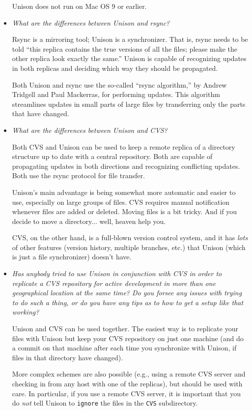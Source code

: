 \begin{itemize}
Unison does not run on Mac OS 9 or earlier.  

\item {\em What are the differences between Unison and rsync?}

Rsync is a mirroring tool; Unison is a synchronizer.  That is, rsync
needs to be told ``this replica contains the true versions of all the
files; please make the other replica look exactly the same.''  Unison
is capable of recognizing updates in both replicas and deciding which way
they should be propagated.

Both Unison and rsync use the so-called ``rsync algorithm,'' by Andrew
Tridgell and Paul Mackerras, for performing updates.  This algorithm
streamlines updates in small parts of large files by transferring only
the parts that have changed.

\item {\em What are the differences between Unison and CVS?}

Both CVS and Unison can be used to keep a remote replica of a
directory structure up to date with a central repository.  Both are
capable of propagating updates in both directions and recognizing
conflicting updates.  Both use the rsync protocol for file transfer.

Unison's main advantage is being somewhat more automatic and easier to
use, especially on large groups of files.  CVS requires manual
notification whenever files are added or deleted.  Moving files is a
bit tricky.  And if you decide to move a directory... well, heaven
help you.

CVS, on the other hand, is a full-blown version control system, and it
has {\em lots} of other features (version history, multiple branches,
etc.)  that Unison (which is just a file synchronizer) doesn't have.

\item {\em Has anybody tried to use Unison in conjunction with CVS
 in order to replicate a CVS repository for active development in more than
 one geographical location at the same time?
 Do you forsee any issues with trying to do such a thing, or do you have any
 tips as to how to get a setup like that working?}

Unison and CVS can be used together.  The easiest way is to replicate
your files with Unison but keep your CVS repository on just one machine
(and do a commit on that machine after each time you synchronize with
Unison, if files in that directory have changed).  

More complex schemes are also possible (e.g., using a remote CVS server
and checking in from any host with one of the replicas), but should be
used with care.  In particular, if you use a remote CVS server, it is
important that you do {\em not} tell Unison to {\tt ignore} the files in
the {\tt CVS} subdirectory.


\end{itemize}
